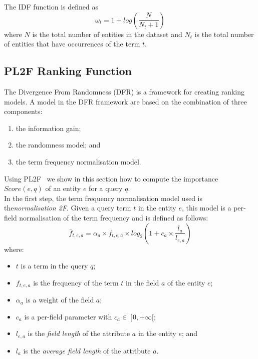 The IDF function is defined as
$$
\omega_t=1+log\left(\frac{N}{N_t+1}\right)
$$
where $N$ is the total number of entities in the dataset and $N_t$ is the total number of entities that have occurrences of the term $t$.

\subsection{PL2F Ranking Function}

The Divergence From Randomness (DFR) is a framework for creating ranking models. A model in the DFR framework are based on the combination of three components:
\begin{enumerate}
	\item the information gain;
	\item the randomness model; and
	\item the term frequency normalisation model.
\end{enumerate}

Using PL2F~\cite{macdonald:2005:clef} we show in this section how to compute the importance $Score(e,q)$ of an entity $e$ for a query $q$.\\

In the first step, the term frequency normalisation model used is the\emph{normalisation 2F}. Given a query term $t$ in the entity $e$, this model is a per-field normalisation of the term frequency and is defined as follows:
\begin{equation}
	\bar{f}_{t,e,a} = \alpha_a\times f_{t,e,a} \times log_2\left(1+c_a\times\frac{l_a}{l_{e,a}}\right)
	\label{eq:pl2f}
\end{equation}
where:
\begin{itemize}
	\item $t$ is a term in the query $q$;
	\item $f_{t,e,a}$ is the frequency of the term $t$ in the field $a$ of the entity $e$;
	\item $\alpha_a$ is a weight of the field $a$;
	\item $c_a$ is a per-field parameter with $c_a \in\;]0,+\infty[$;
	\item $l_{e,a}$ is the \emph{field length} of the attribute $a$ in the entity $e$; and
	\item $l_a$ is the \emph{average field length} of the attribute $a$.\\
\end{itemize}

